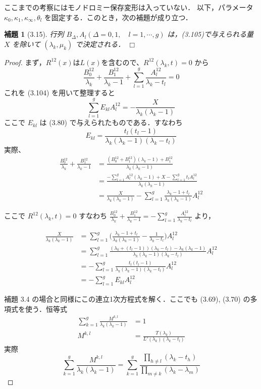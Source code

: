 \documentclass[paper=a4, fontsize=11pt]{jlreq} %
\newenvironment{story}{%
  \begin{mdframed}[
    backgroundcolor=red!5, %
    linewidth=0pt,         %
    innertopmargin=10pt,   %
    innerbottommargin=10pt,
    innerrightmargin=10pt, %
    innerleftmargin=10pt
  ]%
}{%
  \end{mdframed}%
}
\theoremstyle{break}
\newtheorem{lemma}[theorem]{補題}
\theoremstyle{qa}
\begin{document}
\begin{story}
ここまでの考察にはモノドロミー保存変形は入っていない．
以下，パラメータ $\kappa_0, \kappa_1, \kappa_\infty, \theta_l$ を固定する．このとき，次の補題が成り立つ．

\begin{lemma}[3.15]
行列 $B_\Delta, A_l (\Delta=0, 1, \quad l=1, \cdots, g)$ は，(3.105)で与えられる量 $X$ を除いて $(\lambda_k, \mu_k)$ で決定される． \hfill $\Box$
\end{lemma}

\begin{proof}
まず，$R^{12}(x)$は$L(x)$を含むので、$R^{12}(\lambda_k, t) = 0$ から
\[
\frac{B_0^{12}}{\lambda_k} + \frac{B_1^{12}}{\lambda_k - 1} + \sum_{l=1}^g \frac{A_l^{12}}{\lambda_k - t_l} = 0
\]
これを (3.104) を用いて整理すると
\[
\sum_{l=1}^g E_{kl} A_l^{12} = - \frac{X}{\lambda_k (\lambda_k - 1)}
\]
ここで $E_{kl}$ は (3.80) で与えられたものである．すなわち
\[
E_{kl} = \frac{t_l(t_l - 1)}{\lambda_k(\lambda_k - 1)(\lambda_k - t_l)}
\]
実際、
\begin{align*}
    \frac{B_0^{12}}{\lambda_k} + \frac{B_1^{12}}{\lambda_k - 1} &= \frac{(B_0^{12} + B_1^{12})(\lambda_k - 1) + B_1^{12}}{\lambda_k(\lambda_k - 1)} \\
    &= \frac{-\sum_{l=1}^g A_l^{12}(\lambda_k - 1) + X - \sum_{l=1}^g t_l A_l^{12}}{\lambda_k(\lambda_k - 1)} \\
    &= \frac{X}{\lambda_k(\lambda_k - 1)} - \sum_{l=1}^g \frac{\lambda_k - 1 + t_l}{\lambda_k(\lambda_k - 1)} A_l^{12}
\end{align*}

ここで $R^{12}(\lambda_k, t) = 0$ すなわち $\frac{B_0^{12}}{\lambda_k} + \frac{B_1^{12}}{\lambda_k - 1} = -\sum_{l=1}^g \frac{A_l^{12}}{\lambda_k - t_l}$ より，

\begin{align*}
    \frac{X}{\lambda_k(\lambda_k - 1)} &= \sum_{l=1}^g \biggl( \frac{\lambda_k - 1 + t_l}{\lambda_k(\lambda_k - 1)} - \frac{1}{\lambda_k - t_l} \biggr) A_l^{12} \\
    &= \sum_{l=1}^g \frac{(\lambda_k + (t_l - 1))(\lambda_k - t_l) - \lambda_k(\lambda_k - 1)}{\lambda_k(\lambda_k - 1)(\lambda_k - t_l)} A_l^{12} \\
    &= - \sum_{l=1}^g \frac{t_l(t_l - 1)}{\lambda_k(\lambda_k - 1)(\lambda_k - t_l)} A_l^{12} \\
    &= - \sum_{l=1}^g E_{kl} A_l^{12}
\end{align*}

補題 3.4 の場合と同様にこの連立1次方程式を解く．ここでも (3.69), (3.70) の多項式を使う．恒等式
\begin{align}
    \sum_{k=1}^g \frac{M^{k,l}}{\lambda_k(\lambda_k - 1)} &= 1 \tag{3.106} \\
    M^{k,l} &= \frac{T(\lambda_k)}{L'(\lambda_k)(\lambda_k - t_l)}
\end{align}
実際
\[
\sum_{k=1}^g \frac{M^{k,l}}{\lambda_k (\lambda_k - 1)} = \sum_{k=1}^g \frac{\prod_{h \neq l} (\lambda_k - t_h)}{\prod_{m \neq k} (\lambda_k - \lambda_m)}
\]


\end{proof}
\end{story}
\end{document}
